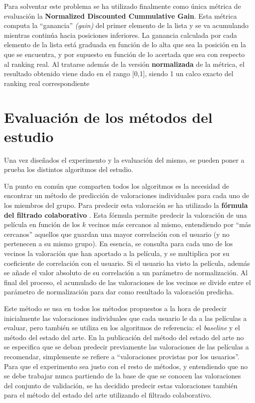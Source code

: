 Para solventar este problema se ha utilizado finalmente como única métrica de evaluación la \textbf{Normalized Discounted Cummulative Gain}. Esta métrica computa la ``ganancia'' \textit{(gain)} del primer elemento de la lista y se va acumulando mientras continúa hacia posiciones inferiores. La ganancia calculada por cada elemento de la lista está graduada en función de lo alta que sea la posición en la que se encuentra, y por supuesto en función de lo acertada que sea con respecto al ranking real. Al tratarse además de la versión \textbf{normalizada} de la métrica, el resultado obtenido viene dado en el rango [0,1], siendo 1 un calco exacto del ranking real correspondiente

\section{Evaluación de los métodos del estudio}

Una vez diseñados el experimento y la evaluación del mismo, se pueden poner a prueba los distintos algoritmos del estudio.

Un punto en común que comparten todos los algoritmos es la necesidad de encontrar un método de predicción de valoraciones individuales para cada uno de los miembros del grupo. Para predecir esta valoración se ha utilizado la \textbf{fórmula del filtrado colaborativo} \cite{recuperacion-informacion}. Esta fórmula permite predecir la valoración de una película en función de los $k$ vecinos más cercanos al mismo, entendiendo por ``más cercanos'' aquellos que guardan una mayor correlación con el usuario (y no pertenecen a su mismo grupo). En esencia, se consulta para cada uno de los vecinos la valoración que han aportado a la película, y se multiplica por su coeficiente de correlación con el usuario. Si el usuario ha visto la película, además se añade el valor absoluto de su correlación a un parámetro de normalización. Al final del proceso, el acumulado de las valoraciones de los vecinos se divide entre el parámetro de normalización para dar como resultado la valoración predicha.

Este método se usa en todos los métodos propuestos a la hora de predecir inicialmente las valoraciones individuales que cada usuario le da a las películas a evaluar, pero también se utiliza en los algoritmos de referencia: el \textit{baseline} y el método del estado del arte. En la publicación del método del estado del arte \cite{pogrs} no se especifica que se deban predecir previamente las valoraciones de las películas a recomendar, simplemente se refiere a ``valoraciones provistas por los usuarios''. Para que el experimento sea justo con el resto de métodos, y entendiendo que no se debe trabajar nunca partiendo de la base de que se conocen las valoraciones del conjunto de validación, se ha decidido predecir estas valoraciones también para el método del estado del arte utilizando el filtrado colaborativo.

